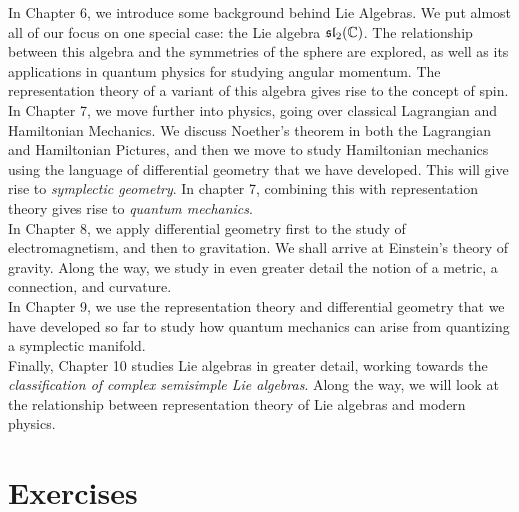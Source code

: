 	In Chapter 6, we introduce some background behind Lie Algebras. We put almost all of our focus on one special case: the Lie algebra $\frak{sl}_2 (\mathbb C)$. The relationship between this algebra and the symmetries of the sphere are explored, as well as its applications in quantum physics for studying angular momentum. The representation theory of a variant of this algebra gives rise to the concept of spin. \\
	
	In Chapter 7, we move further into physics, going over classical Lagrangian and Hamiltonian Mechanics. We discuss Noether's theorem in both the Lagrangian and Hamiltonian Pictures, and then we move to study Hamiltonian mechanics using the language of differential geometry that we have developed. This will give rise to \emph{symplectic geometry}. In chapter 7, combining this with representation theory gives rise to \emph{quantum mechanics}.\\
	
	In Chapter 8, we apply differential geometry first to the study of electromagnetism, and then to gravitation. We shall arrive at Einstein's theory of gravity. Along the way, we study in even greater detail the notion of a metric, a connection, and curvature. \\
	
	In Chapter 9, we use the representation theory and differential geometry that we have developed so far to study how quantum mechanics can arise from quantizing a symplectic manifold.\\
	
	Finally, Chapter 10 studies Lie algebras in greater detail, working towards the \emph{classification of complex semisimple Lie algebras}. Along the way, we will look at the relationship between representation theory of Lie algebras and modern physics. 
	
	
	
	\section{Exercises} %
	\label{sec:exercises2}
	
	